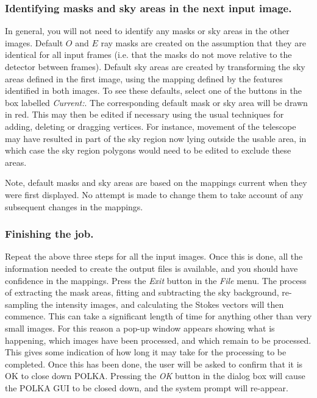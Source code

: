 \documentclass[11pt]{article}
\newcommand{\htmlref}[2]{#1}
\newcommand{\xlabel}[1]{}
\newcommand{\mylabel}[1] {\xlabel{#1}\label{#1}}
\begin{document}
\subsubsection {\mylabel{TUT_NEXT_MASK}Identifying masks and sky areas in the next input image.}
In general, you will not need to identify any masks or sky areas in the
other images. Default $O$ and $E$ ray masks are created on the assumption
that they are identical for all input frames (i.e. that the masks do not
move relative to the detector between frames). Default sky areas are
created by transforming the sky areas defined in the first image, using
the mapping defined by the features identified in both images. To see
these defaults, select one of the buttons in the box labelled
\htmlref{\emph{Current:}}{POLKA_CURRENT}. The corresponding default mask
or sky area will be drawn in red. This may then be
\htmlref{edited}{POLKA_EDITING_POLYGONS} if necessary using the
usual techniques for adding, deleting or dragging vertices. For instance,
movement of the telescope may have resulted in part of the sky region now
lying outside the usable area, in which case the sky region polygons would
need to be edited to exclude these areas.

Note, default masks and sky areas are based on the mappings current when
they were first displayed. No attempt is made to change them to take
account of any subsequent changes in the mappings.

\subsubsection {Finishing the job.}
Repeat the above three steps for all the input images. Once this is done,
all the information needed to create the output files is available, and
you should have confidence in the mappings. Press the \htmlref{{\em
Exit}}{POLKA_EXIT} button in the \htmlref{\emph{File}}{POLKA_FILE_MENU}
menu. The process of extracting the mask areas, fitting and subtracting
the sky background, re-sampling the intensity images, and calculating the
Stokes vectors will then commence. This can take a significant length of
time for anything other than very small images. For this reason a pop-up
window appears showing what is happening, which images have been
processed, and which remain to be processed. This gives some indication
of how long it may take for the processing to be completed. Once this has
been done, the user will be asked to confirm that it is OK to close down
POLKA. Pressing the \emph{OK} button in the dialog box will cause the
POLKA GUI to be closed down, and the system prompt will re-appear.
\end{document}
